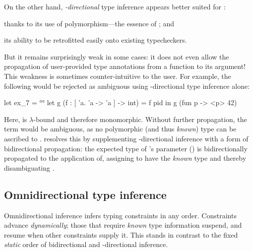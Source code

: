 \documentclass[acmsmall,screen,nonacm%
\Anonymous{,anonymous}{}%
\Final{}{,review}%
]{acmart}
\providecommand{\DIFadd}[1]{\protect\cbstart{\protect\color{blue}#1}\protect\cbend} %
\providecommand{\DIFaddbegin}{} %
\providecommand{\DIFaddend}{} %
\begin{document}
On the other hand, \emph{\geninst-directional} type inference appears better
suited for \ML: %
\begin{enumerate*}
    \item thanks to its use of polymorphism---the essence of \ML; and
    \item its ability to be retrofitted easily onto existing typecheckers.
\end{enumerate*}
But it remains surprisingly weak in some cases: it does not even allow the
propagation of user-provided type annotations from a function to its argument!
This weakness is sometimes counter-intuitive to the user. For example, the
following would be rejected as ambiguous using \geninst-directional type
inference alone:
\begin{program}
let ex_7 = °°
  let g (f : [ 'a. 'a -> 'a ] -> int) = f pid in
  g (fun p -> <p> 42)
\end{program}
Here,  is $\lambda$-bound and therefore monomorphic. Without further
propagation, the term  would be ambiguous, as no polymorphic (and
thus \emph{known}) type can be ascribed to . \OCaml resolves this by
supplementing \geninst-directional inference with a form of bidirectional
propagation: the expected type of 's parameter () is
bidirectionally propagated to the application of\DIFaddbegin \DIFadd{~}\DIFaddend {}, assigning
 to have the \emph{known} type \code{[ 'a. 'a -> 'a ]} and thereby
disambiguating .

\subsection{Omnidirectional type inference}
\label{sec/overview/omni}

%
%
%



Omnidirectional inference infers typing constraints in any order. Constraints
advance \emph{dynamically}; those that require \emph{known} type information
suspend, and resume when other constraints supply it. This stands in contrast
to the fixed \emph{static} order of bidirectional and \geninst-directional
inference.
\end{document}
